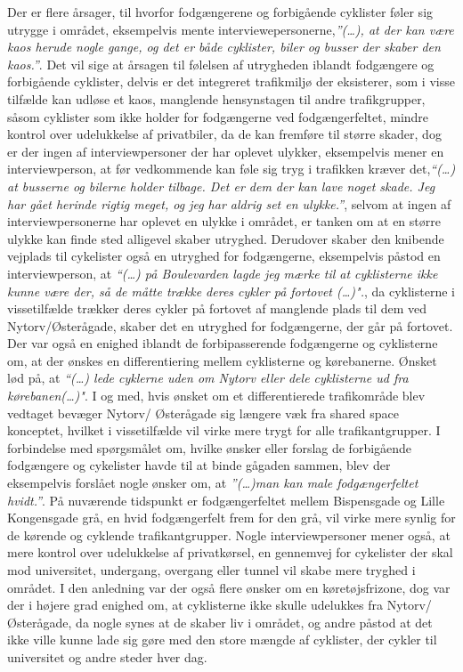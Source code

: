 Der er flere årsager, til hvorfor fodgængerene og forbigående cyklister føler sig utrygge i området, eksempelvis mente interviewepersonerne,\emph{”(…), at der kan være kaos herude nogle gange, og det er både cyklister, biler og busser der skaber den kaos.”}. Det vil sige at årsagen til følelsen af utrygheden iblandt fodgængere og forbigående cyklister, delvis er det integreret trafikmiljø der eksisterer, som i visse tilfælde kan udløse et kaos, manglende hensynstagen til andre trafikgrupper, såsom cyklister som ikke holder for fodgængerne ved fodgængerfeltet, mindre kontrol over udelukkelse af privatbiler, da de kan fremføre til større skader, dog er der ingen af interviewpersoner der har oplevet ulykker,  eksempelvis mener en interviewperson, at før vedkommende kan føle sig tryg i trafikken kræver det,\emph{“(…) at busserne og bilerne holder tilbage. Det er dem der kan lave noget skade. Jeg har gået herinde rigtig meget, og jeg har aldrig set en ulykke.”}, selvom at ingen af interviewpersonerne har oplevet en ulykke i området, er tanken om at en større ulykke kan finde sted alligevel skaber utryghed. Derudover skaber den knibende vejplads til cykelister også en utryghed for fodgængerne, eksempelvis påstod en interviewperson, at \emph{“(…) på Boulevarden lagde jeg mærke til at cyklisterne ikke kunne være der, så de måtte trække deres cykler på fortovet (…)".}, da cyklisterne i vissetilfælde trækker deres cykler på fortovet af manglende plads til dem ved Nytorv/Østerågade, skaber det en utryghed for fodgængerne, der går på fortovet.
\\

Der var også en enighed iblandt de forbipasserende fodgængerne og cyklisterne om, at der ønskes en differentiering mellem cyklisterne og kørebanerne. Ønsket lød på, at \emph{“(…) lede cyklerne uden om Nytorv eller dele cyklisterne ud fra kørebanen(…)"}. I og med, hvis ønsket om et differentierede trafikområde blev vedtaget bevæger Nytorv/ Østerågade sig længere væk fra shared space konceptet, hvilket i vissetilfælde vil virke mere trygt for alle trafikantgrupper.
I forbindelse med spørgsmålet om, hvilke ønsker eller forslag de forbigående fodgængere og cykelister havde til at binde gågaden sammen, blev der eksempelvis forslået nogle ønsker om, at \emph{”(…)man kan male fodgængerfeltet hvidt.”}. På nuværende tidspunkt er fodgængerfeltet mellem Bispensgade og Lille Kongensgade grå, en hvid fodgængerfelt frem for den grå, vil virke mere synlig for de kørende og cyklende trafikantgrupper. Nogle interviewpersoner mener også, at mere kontrol over udelukkelse af privatkørsel, en gennemvej for cykelister der skal mod universitet, undergang, overgang eller tunnel vil skabe mere tryghed i området. I den anledning var der også flere ønsker om en køretøjsfrizone, dog var der i højere grad enighed om, at cyklisterne ikke skulle udelukkes fra Nytorv/Østerågade, da nogle synes at de skaber liv i området, og andre påstod at det ikke ville kunne lade sig gøre med den store mængde af cyklister, der cykler til universitet og andre steder hver dag.

